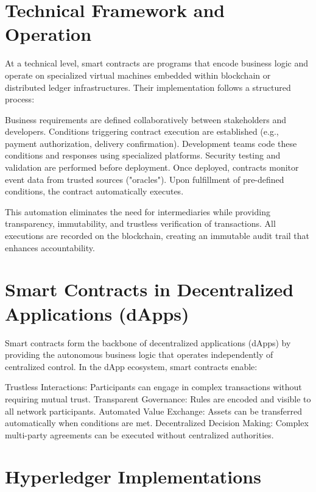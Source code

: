 \documentclass{article}
\begin{document}
\section{Technical Framework and Operation}

At a technical level, smart contracts are programs that encode business logic and operate on specialized virtual machines embedded within blockchain or distributed ledger infrastructures. Their implementation follows a structured process:

Business requirements are defined collaboratively between stakeholders and developers. Conditions triggering contract execution are established (e.g., payment authorization, delivery confirmation). Development teams code these conditions and responses using specialized platforms. Security testing and validation are performed before deployment. Once deployed, contracts monitor event data from trusted sources ("oracles"). Upon fulfillment of pre-defined conditions, the contract automatically executes\cite{simplilearn2022smart}.

This automation eliminates the need for intermediaries while providing transparency, immutability, and trustless verification of transactions. All executions are recorded on the blockchain, creating an immutable audit trail that enhances accountability.

\section{Smart Contracts in Decentralized Applications (dApps)}

Smart contracts form the backbone of decentralized applications (dApps) by providing the autonomous business logic that operates independently of centralized control. In the dApp ecosystem, smart contracts enable:

Trustless Interactions: Participants can engage in complex transactions without requiring mutual trust. Transparent Governance: Rules are encoded and visible to all network participants. Automated Value Exchange: Assets can be transferred automatically when conditions are met. Decentralized Decision Making: Complex multi-party agreements can be executed without centralized authorities\cite{alharby2017blockchain}.

\section{Hyperledger Implementations}
\end{document}
